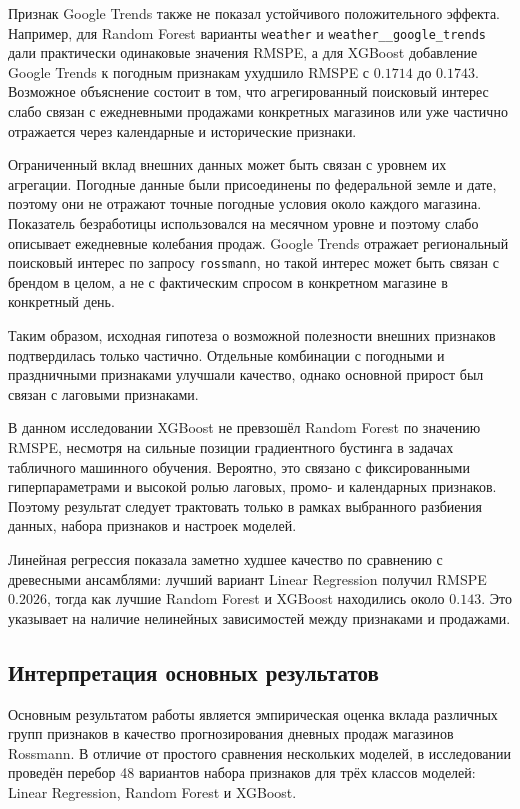 \documentclass[12pt,a4paper]{article}
\numberwithin{equation}{section}
\begin{document}
Признак Google Trends также не показал устойчивого положительного эффекта. Например, для Random Forest варианты \texttt{weather} и \texttt{weather\_\_google\_trends} дали практически одинаковые значения RMSPE, а для XGBoost добавление Google Trends к погодным признакам ухудшило RMSPE с \(0.1714\) до \(0.1743\). Возможное объяснение состоит в том, что агрегированный поисковый интерес слабо связан с ежедневными продажами конкретных магазинов или уже частично отражается через календарные и исторические признаки.

Ограниченный вклад внешних данных может быть связан с уровнем их агрегации. Погодные данные были присоединены по федеральной земле и дате, поэтому они не отражают точные погодные условия около каждого магазина. Показатель безработицы использовался на месячном уровне и поэтому слабо описывает ежедневные колебания продаж. Google Trends отражает региональный поисковый интерес по запросу \texttt{rossmann}, но такой интерес может быть связан с брендом в целом, а не с фактическим спросом в конкретном магазине в конкретный день.

Таким образом, исходная гипотеза о возможной полезности внешних признаков подтвердилась только частично. Отдельные комбинации с погодными и праздничными признаками улучшали качество, однако основной прирост был связан с лаговыми признаками.

В данном исследовании XGBoost не превзошёл Random Forest по значению RMSPE, несмотря на сильные позиции градиентного бустинга в задачах табличного машинного обучения. Вероятно, это связано с фиксированными гиперпараметрами и высокой ролью лаговых, промо- и календарных признаков. Поэтому результат следует трактовать только в рамках выбранного разбиения данных, набора признаков и настроек моделей.

Линейная регрессия показала заметно худшее качество по сравнению с древесными ансамблями: лучший вариант Linear Regression получил RMSPE \(0.2026\), тогда как лучшие Random Forest и XGBoost находились около \(0.143\). Это указывает на наличие нелинейных зависимостей между признаками и продажами.

\subsection{Интерпретация основных результатов}

Основным результатом работы является эмпирическая оценка вклада различных групп признаков в качество прогнозирования дневных продаж магазинов Rossmann. В отличие от простого сравнения нескольких моделей, в исследовании проведён перебор 48 вариантов набора признаков для трёх классов моделей: Linear Regression, Random Forest и XGBoost.
\end{document}
